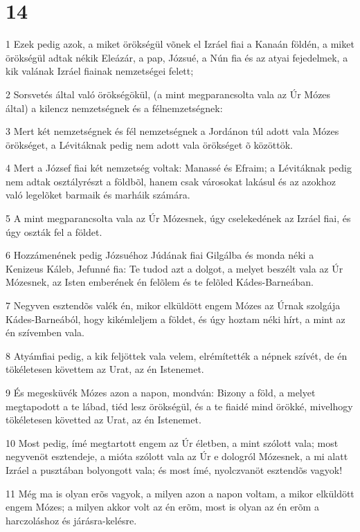 \chapter{14}

\par 1 Ezek pedig azok, a miket örökségül võnek el Izráel fiai a Kanaán földén, a miket örökségül adtak nékik Eleázár, a pap, Józsué, a Nún fia és az atyai fejedelmek, a kik valának Izráel fiainak nemzetségei felett;
\par 2 Sorsvetés által való örökségökül, (a mint megparancsolta vala az Úr Mózes által) a kilencz nemzetségnek és a félnemzetségnek:
\par 3 Mert két nemzetségnek és fél nemzetségnek a Jordánon túl adott vala Mózes örökséget, a Lévitáknak pedig nem adott vala örökséget õ közöttök.
\par 4 Mert a József fiai két nemzetség voltak: Manassé és Efraim; a Lévitáknak pedig nem adtak osztályrészt a földbõl, hanem csak városokat lakásul és az azokhoz való legelõket barmaik és marháik számára.
\par 5 A mint megparancsolta vala az Úr Mózesnek, úgy cselekedének az Izráel fiai, és úgy oszták fel a földet.
\par 6 Hozzámenének pedig Józsuéhoz Júdának fiai Gilgálba és monda néki a Kenizeus Káleb, Jefunné fia: Te tudod azt a dolgot, a melyet beszélt vala az Úr Mózesnek, az Isten emberének én felõlem és te felõled Kádes-Barneában.
\par 7 Negyven esztendõs valék én, mikor elküldött engem Mózes az Úrnak szolgája Kádes-Barneából, hogy kikémleljem a földet, és úgy hoztam néki hírt, a mint az én szívemben vala.
\par 8 Atyámfiai pedig, a kik feljöttek vala velem, elrémítették a népnek szívét, de én tökéletesen követtem az Urat, az én Istenemet.
\par 9 És megesküvék Mózes azon a napon, mondván: Bizony a föld, a melyet megtapodott a te lábad, tiéd lesz örökségül, és a te fiaidé mind örökké, mivelhogy tökéletesen követted az Urat, az én Istenemet.
\par 10 Most pedig, ímé megtartott engem az Úr életben, a mint szólott vala; most negyvenöt esztendeje, a mióta szólott vala az Úr e dologról Mózesnek, a mi alatt Izráel a pusztában bolyongott vala; és most ímé, nyolczvanöt esztendõs vagyok!
\par 11 Még ma is olyan erõs vagyok, a milyen azon a napon voltam, a mikor elküldött engem Mózes; a milyen akkor volt az én erõm, most is olyan az én erõm a harczoláshoz és járásra-kelésre.
